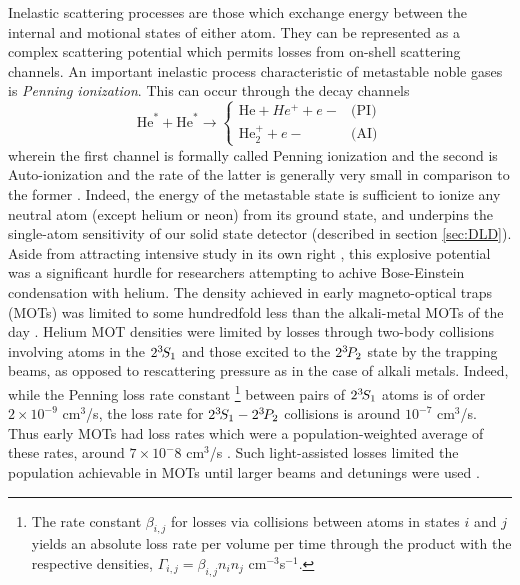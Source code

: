 	Inelastic scattering processes are those which exchange energy between the internal and motional states of either atom.
	They can be represented as a complex scattering potential \cite{leo01} which permits losses from on-shell scattering channels.
	An important inelastic process characteristic of metastable noble gases \cite{VassenReview} is \emph{Penning ionization}.
	 This can occur through the decay channels
	\begin{equation}
		\textrm{He}^*+\textrm{He}^*\rightarrow 
		\begin{cases}
			\textrm{He}+ He^+ + e-&\textrm{(PI)}\\
			\textrm{He}_{2}^{+} + e-&\textrm{(AI)}
		\end{cases}
	\end{equation}
	wherein the first channel is formally called Penning ionization and the second is  Auto-ionization and the rate of the latter is generally very small in comparison to the former \cite{Muller91}.
	Indeed, the energy of the metastable state is sufficient to ionize any neutral atom (except helium or neon) from its ground state, and underpins the single-atom sensitivity of our solid state detector (described in section \ref{sec:DLD}).
	Aside from attracting intensive study in its own right \cite{partridge10,stas06,mcnamara07}, this explosive potential was a significant hurdle for researchers attempting to achive Bose-Einstein condensation with helium.
	The density achieved in early magneto-optical traps (MOTs) was limited to some hundredfold less than the alkali-metal MOTs of the day \cite{bardou92,kumukura92,mastwijk98}.
	Helium MOT densities were limited by losses through two-body collisions involving atoms in the $2^{3\!}S_1$ and those excited to the $2^{3\!} P_2$ state by the trapping beams, as opposed to rescattering pressure as in the case of alkali metals.
	Indeed, while the Penning loss rate constant \footnote{The rate constant $\beta_{i,j}$ for losses via collisions between atoms in states $i$ and $j$ yields an absolute loss rate per volume per time through the product with the respective densities, $\Gamma_{i,j} = \beta_{i,j}n_i n_j$ cm$^{-3}$s$^{-1}$.} between pairs of $2^{3\!}S_1$ atoms is of order $2\times10^{-9}$ cm$^3$/s, the loss rate for $2^{3\!}S_1-2^{3\!} P_2$  collisions is around $10^{-7}$ cm$^3$/s.
	Thus early MOTs had loss rates which were a population-weighted average of these rates, around $7\times10^-8$ cm$^3$/s \cite{weiner99}.
	Such light-assisted losses  limited the population achievable in MOTs until larger beams and detunings were used \cite{tol99}.
